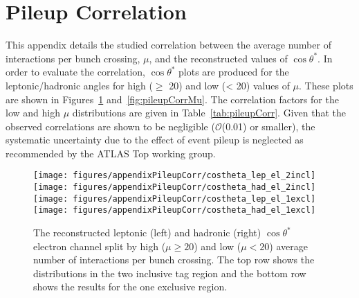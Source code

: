 \clearpage
\section{Pileup Correlation}
\label{app:pileupCorrelation}

This appendix details the studied correlation between the average number of interactions per bunch crossing, $\mu$, and the reconstructed values of $\cos\theta^*$. In order to evaluate the correlation, $\cos\theta^*$ plots are produced for the leptonic/hadronic angles for high ($\geq$ 20) and low (< 20) values of $\mu$. These plots are shown in Figures~\ref{fig:pileupCorrEl} and~\ref{fig:pileupCorrMu}. The correlation factors for the low and high $\mu$ distributions are given in Table~\ref{tab:pileupCorr}. Given that the observed correlations are shown to be negligible ($\mathcal{O}$(0.01) or smaller), the systematic uncertainty due to the effect of event pileup is neglected as recommended by the ATLAS Top working group. 

\begin{figure}[htbp]
\begin{center}
		\texttt{[image: figures/appendixPileupCorr/costheta\_lep\_el\_2incl]}
		\texttt{[image: figures/appendixPileupCorr/costheta\_had\_el\_2incl]}\\
		\texttt{[image: figures/appendixPileupCorr/costheta\_lep\_el\_1excl]}
		\texttt{[image: figures/appendixPileupCorr/costheta\_had\_el\_1excl]}
	\caption{The reconstructed leptonic (left) and hadronic (right) $\cos\theta^*$ electron channel split by high ($\mu\geq 20$) and low ($\mu < 20$) average number of interactions per bunch crossing. The top row shows the distributions in the two inclusive \bt tag region and the bottom row shows the results for the one exclusive region.}
	\label{fig:pileupCorrEl}
\end{center}	
\end{figure}

